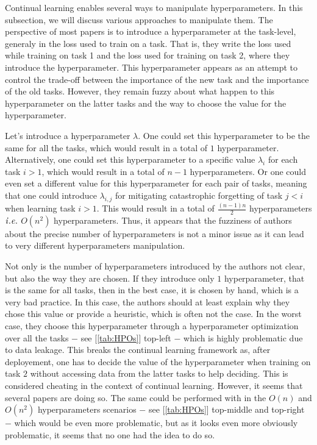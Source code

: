 \documentclass[twocolumn]{article}
\begin{document}
Continual learning enables several ways to manipulate hyperparameters. In this subsection, we will discuss various approaches to manipulate them. The perspective of most papers is to introduce a hyperparameter at the task-level, generaly in the loss used to train on a task. That is, they write the loss used while training on task 1 and the loss used for training on task 2, where they introduce the hyperparameter. This hyperparameter appears as an attempt to control the trade-off between the importance of the new task and the importance of the old tasks. However, they remain fuzzy about what happen to this hyperparameter on the latter tasks and the way to choose the value for the hyperparameter. 

\vspace{1mm}
\noindent
Let's introduce a hyperparameter $\lambda$. One could set this hyperparameter to be the same for all the tasks, which would result in a total of $1$ hyperparameter. Alternatively, one could set this hyperparameter to a specific value $\lambda_i$ for each task $i>1$, which would result in a total of $n-1$ hyperparameters. Or one could even set a different value for this hyperparameter for each pair of tasks, meaning that one could introduce $\lambda_{i,j}$ for mitigating catastrophic forgetting of task $j<i$ when learning task $i>1$. This would result in a total of $\frac{(n-1)n}{2}$ hyperparameters $\it{i.e.}$ $O(n^2)$ hyperparameters. Thus, it appears that the fuzziness of authors about the precise number of hyperparameters is not a minor issue as it can lead to very different hyperparameters manipulation. 

\vspace{1mm}
\noindent
Not only is the number of hyperparameters introduced by the authors not clear, but also the way they are chosen. If they introduce only $1$ hyperparameter, that is the same for all tasks, then in the best case, it is chosen by hand, which is a very bad practice. In this case, the authors should at least explain why they chose this value or provide a heuristic, which is often not the case. In the worst case, they choose this hyperparameter through a hyperparameter optimization over all the tasks $-$ see [\ref{tab:HPOs}] top-left $-$ which is highly problematic due to data leakage. This breaks the continual learning framework as, after deployement, one has to decide the value of the hyperparameter when training on task $2$ without accessing data from the latter tasks to help deciding. This is considered cheating in the context of continual learning. However, it seems that several papers are doing so. The same could be performed with in the $O(n)$ and $O(n^2)$ hyperparameters scenarios $-$ see [\ref{tab:HPOs}] top-middle and top-right $-$ which would be even more problematic, but as it looks even more obviously problematic, it seems that no one had the idea to do so.
\end{document}
